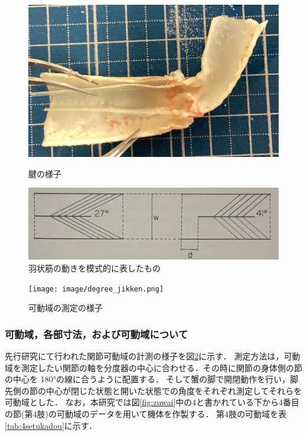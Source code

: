 \begin{figure}[ht]
  \begin{minipage}[b]{0.39\hsize}
    \centering
    \includegraphics[scale=0.08]{image/setukanmaku.jpg}
    \caption{腱の様子\cite{hasegawa}}
    \label{fig:ken}
  \end{minipage}
  \begin{minipage}[b]{0.6\hsize}
    \centering
    \includegraphics[scale=0.18]{image/ujo.JPG}
    \caption{羽状筋の動きを模式的に表したもの\cite{warner1977biology}}
    \label{fig:ujo}
  \end{minipage}
\end{figure}
\begin{figure}[!ht]
  \centering
  \texttt{[image: image/degree\_jikken.png]}
  \caption{可動域の測定の様子}
  \label{fig:sokutei}
\end{figure}
\subsubsection{可動域，各部寸法，および可動域について}
先行研究\cite{hasegawa}にて行われた関節可動域の計測の様子を図\ref{fig:sokutei}に示す．
測定方法は，可動域を測定したい関節の軸を分度器の中心に合わせる．その時に関節の身体側の節の中心を 180°の線に合うように配置する．
そして蟹の脚で開閉動作を行い，脚先側の節の中心が閉じた状態と開いた状態での角度をそれぞれ測定してそれらを可動域とした．
なお，本研究では図\ref{fig:zuwai}中の4と書かれている下から4番目の節(第4肢)の可動域のデータを用いて機体を作製する．
第4肢の可動域を表\ref{tab:4setukadou}に示す．


